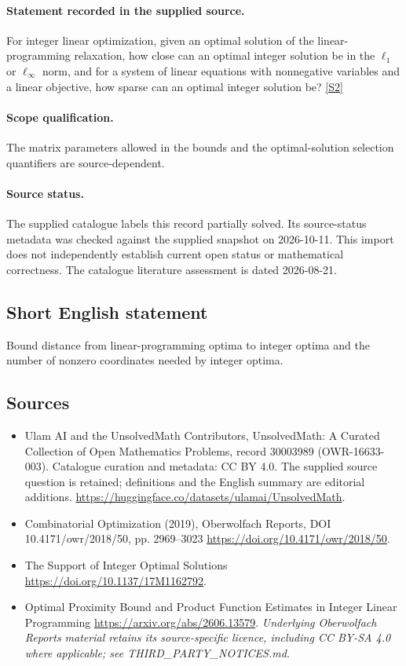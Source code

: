 \documentclass[11pt]{article}
\begin{document}
\paragraph{Statement recorded in the supplied source.}
For integer linear optimization, given an optimal solution of the linear-programming relaxation, how close can an optimal integer solution be in the $\ell_1$ or $\ell_\infty$ norm, and for a system of linear equations with nonnegative variables and a linear objective, how sparse can an optimal integer solution be? \href{https://doi.org/10.4171/owr/2018/50}{[S2]}
\paragraph{Scope qualification.}
The matrix parameters allowed in the bounds and the optimal-solution selection quantifiers are source-dependent.
\paragraph{Source status.}
The supplied catalogue labels this record partially solved. Its source-status metadata was checked against the supplied snapshot on 2026-10-11. This import does not independently establish current open status or mathematical correctness. The catalogue literature assessment is dated 2026-08-21.
\subsection{Short English statement}
Bound distance from linear-programming optima to integer optima and the number of nonzero coordinates needed by integer optima.
\subsection{Sources}
\begin{itemize}
\item[S1] Ulam AI and the UnsolvedMath Contributors, UnsolvedMath: A Curated Collection of Open Mathematics Problems, record 30003989 (OWR-16633-003). Catalogue curation and metadata: CC BY 4.0. The supplied source question is retained; definitions and the English summary are editorial additions.
\url{https://huggingface.co/datasets/ulamai/UnsolvedMath}.
\item[S2] Combinatorial Optimization (2019), Oberwolfach Reports, DOI 10.4171/owr/2018/50, pp. 2969--3023
\url{https://doi.org/10.4171/owr/2018/50}.
\item[S3] The Support of Integer Optimal Solutions
\url{https://doi.org/10.1137/17M1162792}.
\item[S4] Optimal Proximity Bound and Product Function Estimates in Integer Linear Programming
\url{https://arxiv.org/abs/2606.13579}.
\textit{Underlying Oberwolfach Reports material retains its source-specific licence, including CC BY-SA 4.0 where applicable; see THIRD\_PARTY\_NOTICES.md.}
\end{itemize}
\end{document}
